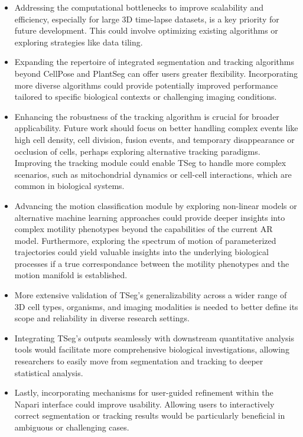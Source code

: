 \documentclass[./dissertation.tex]{subfiles}
\begin{document}
\begin{itemize}
    \item Addressing the computational bottlenecks to improve scalability and efficiency, especially for large 3D time-lapse datasets, is a key priority for future development. This could involve optimizing existing algorithms or exploring strategies like data tiling.

    \item Expanding the repertoire of integrated segmentation and tracking algorithms beyond CellPose and PlantSeg can offer users greater flexibility. Incorporating more diverse algorithms could provide potentially improved performance tailored to specific biological contexts or challenging imaging conditions.

    \item Enhancing the robustness of the tracking algorithm is crucial for broader applicability. Future work should focus on better handling complex events like high cell density, cell division, fusion events, and temporary disappearance or occlusion of cells, perhaps exploring alternative tracking paradigms. Improving the tracking module could enable TSeg to handle more complex scenarios, such as mitochondrial dynamics or cell-cell interactions, which are common in biological systems.

    \item Advancing the motion classification module by exploring non-linear models or alternative machine learning approaches could provide deeper insights into complex motility phenotypes beyond the capabilities of the current AR model. Furthermore, exploring the spectrum of motion of parameterized trajectories could yield valuable insights into the underlying biological processes if a true correspondance between the motility phenotypes and the motion manifold is established.

    \item More extensive validation of TSeg's generalizability across a wider range of 3D cell types, organisms, and imaging modalities is needed to better define its scope and reliability in diverse research settings.

    \item Integrating TSeg's outputs seamlessly with downstream quantitative analysis tools would facilitate more comprehensive biological investigations, allowing researchers to easily move from segmentation and tracking to deeper statistical analysis.

    \item Lastly, incorporating mechanisms for user-guided refinement within the Napari interface could improve usability. Allowing users to interactively correct segmentation or tracking results would be particularly beneficial in ambiguous or challenging cases.
\end{itemize}
\end{document}
